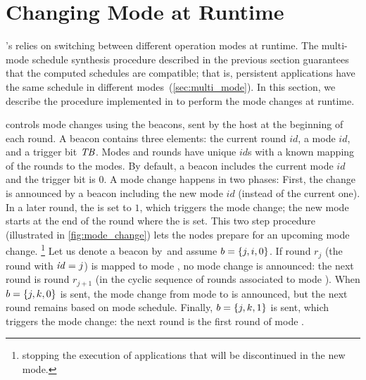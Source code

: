 
\section{Changing Mode at Runtime}
\label{sec:modeChanges}

\TTW's  relies on switching between different operation modes at runtime. The multi-mode schedule synthesis procedure described in the previous section guarantees that the computed schedules are compatible; that is, persistent applications have the same schedule in different modes~(\cref{sec:multi_mode}).
In this section, we describe the procedure implemented in \TTW to perform the mode changes at runtime.

\TTW controls mode changes using the beacons, sent by the host at the beginning of each round. A beacon contains three elements: the current round $id$, a mode $id$, and a trigger bit $\mathit{TB}$.
Modes and rounds have unique $id$s with a known mapping of the rounds to the modes. By default, a beacon includes the current mode $id$ and the trigger bit is $0$.
%
A mode change happens in two phases:
First, the change is announced by a beacon including the new mode $id$ (instead of the current one).
In a later round, the \TB is set to $1$, which triggers the mode change; the new mode starts at the end of the round where the \TB is set.
This two step procedure (illustrated in \cref{fig:mode_change}) lets the nodes prepare for an upcoming mode change.%
%
\footnote{\Eg stopping the execution of applications that will be discontinued in the new mode.}
%
Let us denote a beacon by~\beacon and assume $b = \{j, i, 0\}$.
If round $r_j$ (the round with $\mathit{id}=j$) is mapped to mode \modei, no mode change is announced:
the next round is round $r_{j+1}$ (in the cyclic sequence of rounds associated to mode ).
When $b = \{j, k, 0\}$ is sent, the mode change from mode \modei to  is announced, but the next round remains based on mode \modei schedule.
Finally, $b = \{j, k, 1\}$ is sent, which triggers the mode change: the next round is the first round of mode .


\squarepar{%
	Many mode change protocols have been proposed in the literature~(see~\cite{chen2018SafeMC} for an overview). These protocols define the expected behavior of applications in the old and new modes; for example, they specify whether the running applications should be left enough time to complete, or be interrupted by the mode change.
	\TTW does not define a specific mode change protocol. Instead, it provides a general strategy to execute mode changes and lets the user define the desired mode change protocol and implement it at the application level.%
}

